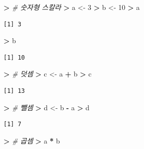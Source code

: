 \documentclass[12pt,a4paper]{book}
\newenvironment{Shaded}{\begin{snugshade}}{\end{snugshade}}
\newcommand{\DecValTok}[1]{\textcolor[rgb]{0.00,0.00,0.81}{#1}}
\newcommand{\StringTok}[1]{\textcolor[rgb]{0.31,0.60,0.02}{#1}}
\newcommand{\CommentTok}[1]{\textcolor[rgb]{0.56,0.35,0.01}{\textit{#1}}}
\newcommand{\OperatorTok}[1]{\textcolor[rgb]{0.81,0.36,0.00}{\textbf{#1}}}
\newcommand{\ErrorTok}[1]{\textcolor[rgb]{0.64,0.00,0.00}{\textbf{#1}}}
\newcommand{\NormalTok}[1]{#1}
\theoremstyle{definition}
\theoremstyle{definition}
\theoremstyle{definition}
\theoremstyle{remark}
\begin{document}
\begin{Shaded}
\begin{Highlighting}[]
\OperatorTok{>}\StringTok{ }\CommentTok{# 숫자형 스칼라}
\ErrorTok{>}\StringTok{ }\NormalTok{a <-}\StringTok{ }\DecValTok{3}
\OperatorTok{>}\StringTok{ }\NormalTok{b <-}\StringTok{ }\DecValTok{10}
\OperatorTok{>}\StringTok{ }\NormalTok{a}
\end{Highlighting}
\end{Shaded}

\begin{verbatim}
[1] 3
\end{verbatim}

\begin{Shaded}
\begin{Highlighting}[]
\OperatorTok{>}\StringTok{ }\NormalTok{b}
\end{Highlighting}
\end{Shaded}

\begin{verbatim}
[1] 10
\end{verbatim}

\begin{Shaded}
\begin{Highlighting}[]
\OperatorTok{>}\StringTok{ }\CommentTok{# 덧셈}
\ErrorTok{>}\StringTok{ }\NormalTok{c <-}\StringTok{ }\NormalTok{a }\OperatorTok{+}\StringTok{ }\NormalTok{b}
\OperatorTok{>}\StringTok{ }\NormalTok{c}
\end{Highlighting}
\end{Shaded}

\begin{verbatim}
[1] 13
\end{verbatim}

\begin{Shaded}
\begin{Highlighting}[]
\OperatorTok{>}\StringTok{ }\CommentTok{# 뺄셈}
\ErrorTok{>}\StringTok{ }\NormalTok{d <-}\StringTok{ }\NormalTok{b }\OperatorTok{-}\StringTok{ }\NormalTok{a}
\OperatorTok{>}\StringTok{ }\NormalTok{d}
\end{Highlighting}
\end{Shaded}

\begin{verbatim}
[1] 7
\end{verbatim}

\begin{Shaded}
\begin{Highlighting}[]
\OperatorTok{>}\StringTok{ }\CommentTok{# 곱셈}
\ErrorTok{>}\StringTok{ }\NormalTok{a }\OperatorTok{*}\StringTok{ }\NormalTok{b}
\end{Highlighting}
\end{Shaded}
\end{document}
